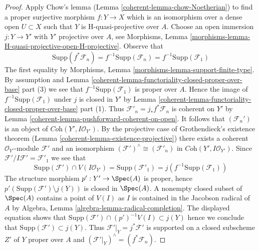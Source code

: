 \begin{proof}
\medskip\noindent
Apply Chow's lemma (Lemma \ref{coherent-lemma-chow-Noetherian}) to find a
proper surjective morphism $f : Y \to X$ which is an isomorphism
over a dense open $U \subset X$ such that $Y$ is H-quasi-projective
over $A$. Choose an open immersion $j : Y \to Y'$ with
$Y'$ projective over $A$, see
Morphisms, Lemma \ref{morphisms-lemma-H-quasi-projective-open-H-projective}.
Observe that
$$
\text{Supp}(f^*\mathcal{F}_n) = f^{-1}\text{Supp}(\mathcal{F}_n) =
f^{-1}\text{Supp}(\mathcal{F}_1)
$$
The first equality by
Morphisms, Lemma \ref{morphisms-lemma-support-finite-type}.
By assumption and
Lemma \ref{coherent-lemma-functoriality-closed-proper-over-base} part (3)
we see that $f^{-1}\text{Supp}(\mathcal{F}_1)$ is proper over $A$.
Hence the image of $f^{-1}\text{Supp}(\mathcal{F}_1)$
under $j$ is closed in $Y'$ by
Lemma \ref{coherent-lemma-functoriality-closed-proper-over-base} part (1).
Thus $\mathcal{F}'_n = j_*f^*\mathcal{F}_n$ is coherent on
$Y'$ by Lemma \ref{coherent-lemma-pushforward-coherent-on-open}.
It follows that $(\mathcal{F}_n')$
is an object of $\textit{Coh}(Y', I\mathcal{O}_{Y'})$.
By the projective case of Grothendieck's existence theorem
(Lemma \ref{coherent-lemma-existence-projective})
there exists a coherent $\mathcal{O}_{Y'}$-module
$\mathcal{F}'$ and an isomorphism
$(\mathcal{F}')^\wedge \cong (\mathcal{F}'_n)$ in
$\textit{Coh}(Y', I\mathcal{O}_{Y'})$.
Since $\mathcal{F}'/I\mathcal{F}' = \mathcal{F}'_1$ we see that
$$
\text{Supp}(\mathcal{F}') \cap V(I\mathcal{O}_{Y'}) =
\text{Supp}(\mathcal{F}'_1) = j(f^{-1}\text{Supp}(\mathcal{F}_1))
$$
The structure morphism $p' : Y' \to \Spec(A)$ is proper, hence
$p'(\text{Supp}(\mathcal{F}') \setminus j(Y))$
is closed in $\Spec(A)$. A nonempty closed subset of $\Spec(A)$
contains a point of $V(I)$ as $I$ is contained in the Jacobson radical
of $A$ by Algebra, Lemma \ref{algebra-lemma-radical-completion}.
The displayed equation shows that
$\text{Supp}(\mathcal{F}') \cap (p')^{-1}V(I) \subset j(Y)$
hence we conclude that $\text{Supp}(\mathcal{F}') \subset j(Y)$.
Thus $\mathcal{F}'|_Y = j^*\mathcal{F}'$
is supported on a closed subscheme $Z'$ of $Y$ proper over $A$
and $(\mathcal{F}'|_Y)^\wedge = (f^*\mathcal{F}_n)$.


\end{proof}
